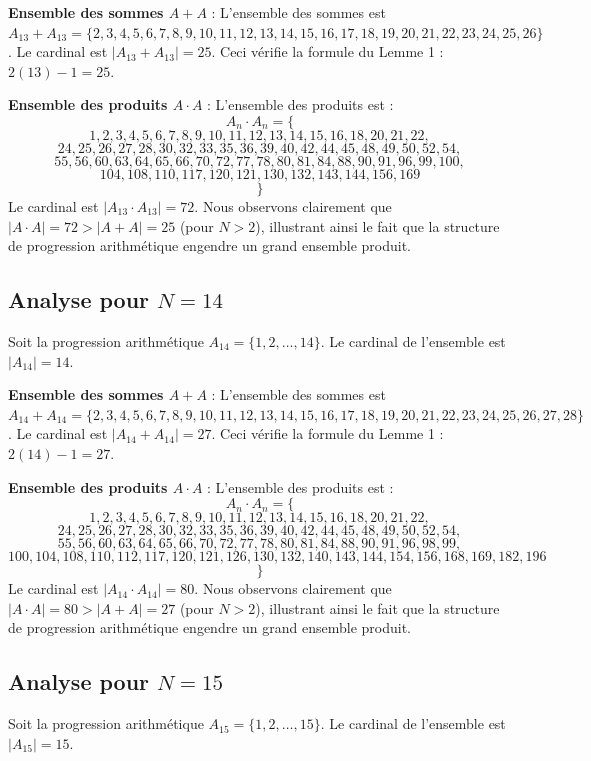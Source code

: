 \documentclass[11pt,a4paper]{article}
\begin{document}
\textbf{Ensemble des sommes $A+A$} :
L'ensemble des sommes est $A_{13} + A_{13} = \{2, 3, 4, 5, 6, 7, 8, 9, 10, 11, 12, 13, 14, 15, 16, 17, 18, 19, 20, 21, 22, 23, 24, 25, 26\} $. Le cardinal est $|A_{13} + A_{13}| = 25$. Ceci vérifie la formule du Lemme 1 : $2(13) - 1 = 25$.

\textbf{Ensemble des produits $A \cdot A$} :
L'ensemble des produits est :
$$ A_{{{n}}} \cdot A_{{{n}}} = \{ $$$$ 1, 2, 3, 4, 5, 6, 7, 8, 9, 10, 11, 12, 13, 14, 15, 16, 18, 20, 21, 22, $$$$ 24, 25, 26, 27, 28, 30, 32, 33, 35, 36, 39, 40, 42, 44, 45, 48, 49, 50, 52, 54, $$$$ 55, 56, 60, 63, 64, 65, 66, 70, 72, 77, 78, 80, 81, 84, 88, 90, 91, 96, 99, 100, $$$$ 104, 108, 110, 117, 120, 121, 130, 132, 143, 144, 156, 169 $$$$ \} $$
Le cardinal est $|A_{13} \cdot A_{13}| = 72$.
Nous observons clairement que $|A \cdot A| = 72 > |A+A| = 25$ (pour $N > 2$), illustrant ainsi le fait que la structure de progression arithmétique engendre un grand ensemble produit.
\newpage

\subsection{Analyse pour $N = 14$}
Soit la progression arithmétique $A_{14} = \{1, 2, \dots, 14\} $. Le cardinal de l'ensemble est $|A_{14}| = 14$.

\textbf{Ensemble des sommes $A+A$} :
L'ensemble des sommes est $A_{14} + A_{14} = \{2, 3, 4, 5, 6, 7, 8, 9, 10, 11, 12, 13, 14, 15, 16, 17, 18, 19, 20, 21, 22, 23, 24, 25, 26, 27, 28\} $. Le cardinal est $|A_{14} + A_{14}| = 27$. Ceci vérifie la formule du Lemme 1 : $2(14) - 1 = 27$.

\textbf{Ensemble des produits $A \cdot A$} :
L'ensemble des produits est :
$$ A_{{{n}}} \cdot A_{{{n}}} = \{ $$$$ 1, 2, 3, 4, 5, 6, 7, 8, 9, 10, 11, 12, 13, 14, 15, 16, 18, 20, 21, 22, $$$$ 24, 25, 26, 27, 28, 30, 32, 33, 35, 36, 39, 40, 42, 44, 45, 48, 49, 50, 52, 54, $$$$ 55, 56, 60, 63, 64, 65, 66, 70, 72, 77, 78, 80, 81, 84, 88, 90, 91, 96, 98, 99, $$$$ 100, 104, 108, 110, 112, 117, 120, 121, 126, 130, 132, 140, 143, 144, 154, 156, 168, 169, 182, 196 $$$$ \} $$
Le cardinal est $|A_{14} \cdot A_{14}| = 80$.
Nous observons clairement que $|A \cdot A| = 80 > |A+A| = 27$ (pour $N > 2$), illustrant ainsi le fait que la structure de progression arithmétique engendre un grand ensemble produit.
\newpage

\subsection{Analyse pour $N = 15$}
Soit la progression arithmétique $A_{15} = \{1, 2, \dots, 15\} $. Le cardinal de l'ensemble est $|A_{15}| = 15$.
\end{document}

